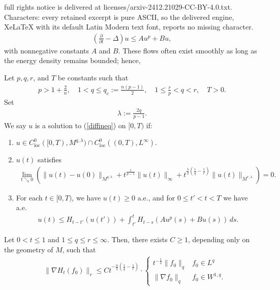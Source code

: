 \documentclass[10pt,a4paper]{amsart}
\newcommand{\p}{{ \partial}}
\begin{document}
full rights notice is delivered at licenses/arxiv-2412.21029-CC-BY-4.0.txt. Characters: every retained excerpt is pure ASCII, so the delivered engine, XeLaTeX with its default Latin Modern text font, reports no missing character.
\begin{align}\label{diffineq}
    \left( \frac{\p}{\p t} - \Delta \right) u \leq Au^p + Bu,
\end{align} with nonnegative constants \(A\) and \(B\). These flows often exist smoothly as long as the energy density remains bounded; hence, 

\begin{definition}\label{defn:weaksolution}
        Let \(p, q, r\), and \(T\) be constants such that
        \begin{align*}
            p > 1 + \frac{2}{n}, \quad 1 < q \leq q_c := \frac{n(p-1)}{2}, \quad 1 \leq \frac{r}{p} < q < r, \quad T > 0.
        \end{align*}Set
        \begin{align*}
            \lambda := \frac{2q}{p-1}.
        \end{align*} We say \(u\) is a solution to (\ref{diffineq}) on \([0, T)\) if:
        \begin{enumerate}
            \item \(u \in C_{\text{loc}}^0([0, T), M^{q, \lambda}) \cap C_{\text{loc}}^0((0, T), L^\infty)\). 
            \item \(u(t)\) satisfies 
        \begin{align*}
            \lim_{t \searrow 0} \left(\|u(t) - u(0)\|_{M^{q, \lambda}} + t^{\frac{1}{p-1}} \|u(t)\|_\infty + t^{\frac{\lambda}{2}\left(\frac{1}{q} - \frac{1}{r}\right)}\|u(t)\|_{M^{r, \lambda}}\right)  = 0.
        \end{align*}
        \item For each \(t \in [0, T)\), we have \(u(t) \geq 0\) a.e., and for \(0 \leq t' < t < T\) we have a.e.
        \begin{align}\label{weaksolution:subsolution}
            u(t) \leq H_{t-t'}(u(t')) + \int_{t'}^t H_{t-s}(Au^p(s) + Bu(s)) \, ds.
        \end{align}
        \end{enumerate}
    \end{definition}

   \begin{lemma}\label{lemma:gradientestimates}
        Let \(0 < t \leq 1\) and \(1 \leq q \leq r \leq \infty\). Then, there exists \(C \geq 1\), depending only on the geometry of \(M\), such that
   \begin{align*}
       &\|\nabla H_t(f_0)\|_r \leq C t^{-\frac{n}{2}\left(\frac{1}{q} -\frac{1}{r}\right)} \cdot \begin{cases} t^{-\frac12}\|f_0\|_q & f_0 \in L^q\\
       \| \nabla f_0\|_q & f_0 \in W^{1,q}.
       \end{cases}
   \end{align*}
   \end{lemma}
\end{document}
